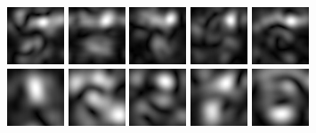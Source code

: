\begin{figure}
\begin{center}
 \includegraphics[scale=0.5]{ch4/figures/mag_1_3.jpg}
 \includegraphics[scale=0.5]{ch4/figures/mag_1_4.jpg}
 \includegraphics[scale=0.5]{ch4/figures/mag_1_5.jpg}
 \includegraphics[scale=0.5]{ch4/figures/mag_1_6.jpg}
 \includegraphics[scale=0.5]{ch4/figures/mag_1_7.jpg}\\
 \includegraphics[scale=0.5]{ch4/figures/mag_2_0.jpg}
 \includegraphics[scale=0.5]{ch4/figures/mag_2_1.jpg}
 \includegraphics[scale=0.5]{ch4/figures/mag_2_2.jpg}
 \includegraphics[scale=0.5]{ch4/figures/mag_2_3.jpg}
 \includegraphics[scale=0.5]{ch4/figures/mag_2_4.jpg}

\end{center}
\end{figure}
